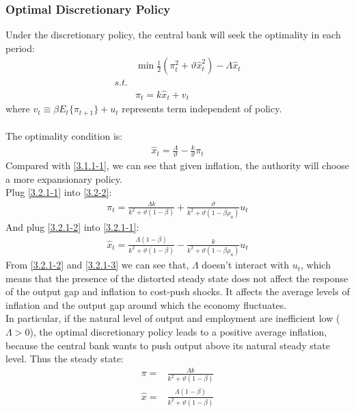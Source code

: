 \documentclass{article}
\numberwithin{equation}{section}
\begin{document}
\subsubsection{Optimal Discretionary Policy}
Under the discretionary policy, the central bank will seek the optimality in each period:
	\begin{align*}
		&\min \frac{1}{2}(\pi^2_t + \vartheta\hat{x}^2_t) - \Lambda\hat{x}_t\\
		s.t.&\\
		&\pi_t = k\hat{x}_t + v_t
	\end{align*}
where $v_t \equiv \beta E_t\{ \pi_{t+1} \} + u_t$ represents term independent of policy.\\\\
The optimality condition is:
	\begin{align}
		\hat{x}_t = \frac{\Lambda}{\vartheta} - \frac{k}{\vartheta}\pi_t \label{3.2.1-1}
	\end{align}
Compared with \eqref{3.1.1-1}, we can see that given inflation, the authority will choose a more expansionary policy.\\
Plug \eqref{3.2.1-1} into \eqref{3.2-2}:
	\begin{align}
		\pi_t = \frac{\Lambda k}{k^2 + \vartheta(1 - \beta)} + \frac{\vartheta}{k^2 + \vartheta(1 - \beta\rho_u)}u_t \label{3.2.1-2}
	\end{align}
And plug \eqref{3.2.1-2} into \eqref{3.2.1-1}:
	\begin{align}
		\hat{x}_t = \frac{\Lambda(1 - \beta)}{k^2 + \vartheta(1 - \beta)} - \frac{k}{k^2 + \vartheta(1 - \beta\rho_u)}u_t \label{3.2.1-3}
	\end{align}
From \eqref{3.2.1-2} and \eqref{3.2.1-3} we can see that, $\Lambda$ doesn't interact with $u_t$, which means that the presence of the distorted steady state does not affect the response of the output gap and inflation to cost-push shocks. It affects the average levels of inflation and the output gap around which the economy fluctuates.\\
In particular, if the natural level of output and employment are inefficient low ($\Lambda > 0$), the optimal discretionary policy leads to a positive average inflation, because the central bank wants to push output above its natural steady state level. Thus the steady state:
	\begin{align*}
		\pi = &\frac{\Lambda k}{k^2 + \vartheta(1 - \beta)}\\
		\hat{x} = &\frac{\Lambda(1 - \beta)}{k^2 + \vartheta(1 - \beta)}
	\end{align*} 
\end{document}

